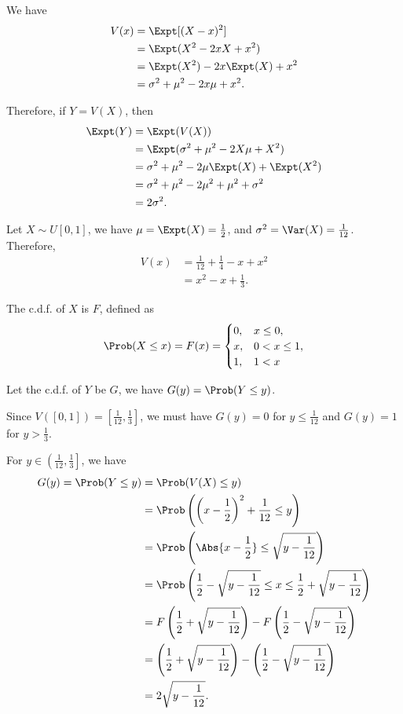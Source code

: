 \Question{\currfilebase}

We have
\begin{align*}
    V(x) &= \Expt[(X-x)^2]\\
    &= \Expt(X^2 - 2xX + x^2)\\
    &= \Expt(X^2) - 2x\Expt(X) + x^2\\
    &= \sigma^2 + \mu^2 - 2x\mu + x^2.
\end{align*}

Therefore, if \(Y = V(X)\), then
\begin{align*}
    \Expt(Y) &= \Expt(V(X))\\
    &= \Expt(\sigma^2 + \mu^2 - 2X\mu + X^2)\\
    &= \sigma^2 + \mu^2 - 2\mu \Expt(X) + \Expt(X^2)\\
    &= \sigma^2 + \mu^2 - 2\mu^2 + \mu^2 + \sigma^2\\
    &= 2\sigma^2.
\end{align*}

Let \(X \sim U[0, 1]\), we have \(\mu = \Expt(X) = \frac{1}{2}\), and \(\sigma^2 = \Var(X) = \frac{1}{12}\). Therefore,
\begin{align*}
    V(x) &= \frac{1}{12} + \frac{1}{4} - x + x^2\\
    &= x^2 - x + \frac{1}{3}.
\end{align*}

The c.d.f. of \(X\) is \(F\), defined as
\[
\Prob(X \leq x) = F(x) =
\begin{cases}
    0, & x \leq 0,\\
    x, & 0 < x \leq 1,\\
    1, & 1 < x
\end{cases}
\]

Let the c.d.f. of \(Y\) be \(G\), we have \(G(y) = \Prob(Y \leq y)\).

Since \(V([0, 1]) = \left[\frac{1}{12}, \frac{1}{3}\right]\), we must have \(G(y) = 0\) for \(y \leq \frac{1}{12}\) and \(G(y) = 1\) for \(y > \frac{1}{3}\).

For \(y \in \left(\frac{1}{12}, \frac{1}{3}\right]\), we have
\begin{align*}
    G(y) = \Prob(Y \leq y) &= \Prob(V(X) \leq y)\\
    &= \Prob\left(\left(x - \frac{1}{2}\right)^2 + \frac{1}{12} \leq y\right)\\
    &= \Prob\left(\Abs{x - \frac{1}{2}} \leq \sqrt{y - \frac{1}{12}}\right)\\
    &= \Prob\left(\frac{1}{2} - \sqrt{y - \frac{1}{12}} \leq x \leq \frac{1}{2} + \sqrt{y - \frac{1}{12}}\right)\\
    &= F\left(\frac{1}{2} + \sqrt{y - \frac{1}{12}}\right) - F\left(\frac{1}{2} - \sqrt{y - \frac{1}{12}}\right)\\
    &= \left(\frac{1}{2} + \sqrt{y - \frac{1}{12}}\right) - \left(\frac{1}{2} - \sqrt{y - \frac{1}{12}}\right)\\
    &= 2 \sqrt{y - \frac{1}{12}}.
\end{align*}

